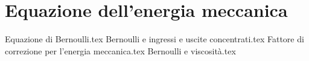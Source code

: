%
\chapter{Equazione dell'energia meccanica}
%
{Equazione di Bernoulli.tex}
{Bernoulli e ingressi e uscite concentrati.tex}
{Fattore di correzione per l'energia meccanica.tex}
{Bernoulli e viscosità.tex}
